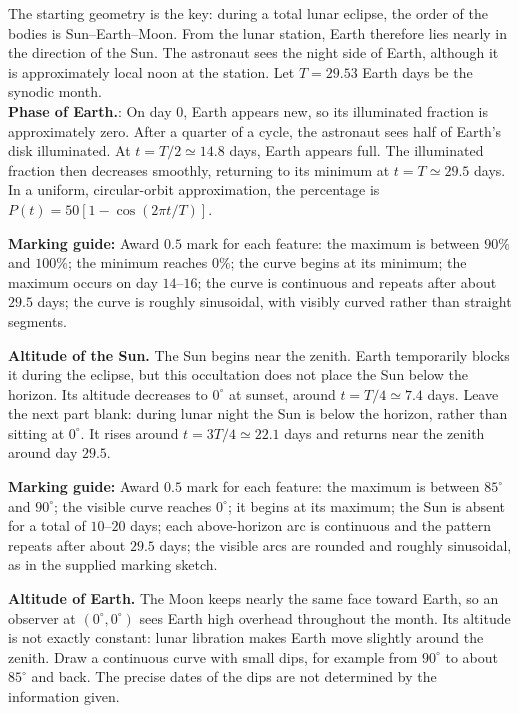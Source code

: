 \documentclass[a4paper,12pt]{extarticle}
\begin{document}
\begin{sol}
	The starting geometry is the key: during a total lunar eclipse, the
	order of the bodies is Sun--Earth--Moon. From the lunar station, Earth
	therefore lies nearly in the direction of the Sun. The astronaut sees
	the night side of Earth, although it is approximately local noon at the
	station. Let $T=29.53$ Earth days be the synodic month.\\
	
	\textbf{Phase of Earth.}: On day $0$, Earth appears new, so its illuminated fraction is approximately zero. After a quarter of a cycle, the astronaut sees
	half of Earth's disk illuminated. At $t=T/2\simeq14.8$ days, Earth
	appears full. The illuminated fraction then decreases smoothly,
	returning to its minimum at $t=T\simeq29.5$ days. In a uniform,
	circular-orbit approximation, the percentage is
	$P(t)=50[1-\cos(2\pi t/T)]$.
\end{sol}
\begin{defi}
	\footnotesize
	{\color{red}\small \textbf{Marking guide:} Award $0.5$ mark for each feature:
		the maximum is between $90\%$ and $100\%$; the minimum reaches
		$0\%$; the curve begins at its minimum; the maximum occurs on
		day $14$--$16$; the curve is continuous and repeats after about
		$29.5$ days; the curve is roughly sinusoidal, with visibly curved
		rather than straight segments.}
\end{defi}
\begin{sol}
	\textbf{Altitude of the Sun.}
	The Sun begins near the zenith. Earth temporarily blocks it during
	the eclipse, but this occultation does not place the Sun below the
	horizon. Its altitude decreases to $0^\circ$ at sunset, around
	$t=T/4\simeq7.4$ days. Leave the next part blank: during lunar
	night the Sun is below the horizon, rather than sitting at
	$0^\circ$. It rises around $t=3T/4\simeq22.1$ days and returns
	near the zenith around day $29.5$.
\end{sol}
\begin{defi}
	\footnotesize
	{\color{red}\small \textbf{Marking guide:} Award $0.5$ mark for each feature:
		the maximum is between $85^\circ$ and $90^\circ$; the visible
		curve reaches $0^\circ$; it begins at its maximum; the Sun is
		absent for a total of $10$--$20$ days; each above-horizon arc is
		continuous and the pattern repeats after about $29.5$ days;
		the visible arcs are rounded and roughly sinusoidal, as in the
		supplied marking sketch.}
\end{defi}
\begin{sol}
	\textbf{Altitude of Earth.}
	The Moon keeps nearly the same face toward Earth, so an observer at
	$(0^\circ,0^\circ)$ sees Earth high overhead throughout the month.
	Its altitude is not exactly constant: lunar libration makes Earth
	move slightly around the zenith. Draw a continuous curve with small
	dips, for example from $90^\circ$ to about $85^\circ$ and back.
	The precise dates of the dips are not determined by the information
	given.
\end{sol}
\end{document}
